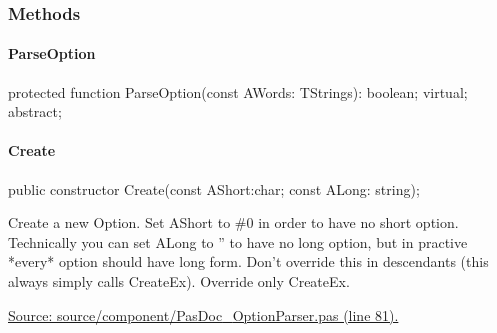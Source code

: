 \documentclass{report}
\newif\ifpdf
\begin{document}
\subsubsection*{\large{\textbf{Methods}}\normalsize\hspace{1ex}\hfill}
\paragraph*{ParseOption}\hspace*{\fill}

\label{PasDoc_OptionParser.TOption-ParseOption}
\begin{list}{}{
\setlength{\itemindent}{0cm}
\setlength{\listparindent}{0cm}
\setlength{\leftmargin}{\evensidemargin}
\addtolength{\leftmargin}{\tmplength}
\settowidth{\labelsep}{X}
\addtolength{\leftmargin}{\labelsep}
\setlength{\labelwidth}{\tmplength}
}
\item[\textbf{Declaration}\hfill]
\ifpdf
\begin{flushleft}
\fi
\begin{ttfamily}
protected function ParseOption(const AWords: TStrings): boolean; virtual; abstract;\end{ttfamily}

\ifpdf
\end{flushleft}
\fi

\end{list}
\paragraph*{Create}\hspace*{\fill}

\label{PasDoc_OptionParser.TOption-Create}
\begin{list}{}{
\setlength{\itemindent}{0cm}
\setlength{\listparindent}{0cm}
\setlength{\leftmargin}{\evensidemargin}
\addtolength{\leftmargin}{\tmplength}
\settowidth{\labelsep}{X}
\addtolength{\leftmargin}{\labelsep}
\setlength{\labelwidth}{\tmplength}
}
\item[\textbf{Declaration}\hfill]
\ifpdf
\begin{flushleft}
\fi
\begin{ttfamily}
public constructor Create(const AShort:char; const ALong: string);\end{ttfamily}

\ifpdf
\end{flushleft}
\fi

\par
\item[\textbf{Description}]
Create a new Option. Set AShort to {\#}0 in order to have no short option. Technically you can set ALong to '' to have no long option, but in practive *every* option should have long form. Don't override this in descendants (this always simply calls CreateEx). Override only CreateEx.\par
\href{https://github.com/pasdoc/pasdoc/blob/master/source/component/PasDoc_OptionParser.pas#L81}{Source: source/component/PasDoc{\_}OptionParser.pas (line 81).}

\end{list}
\end{document}
